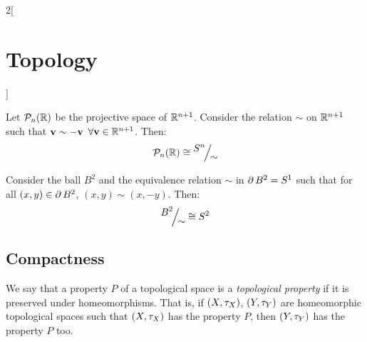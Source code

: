 \documentclass[../../../main.tex]{subfiles}
\begin{document}
\begin{multicols}{2}[\section{Topology}]
\begin{center}
\begin{minipage}{\linewidth}
            \centering
            
            \label{TOP_klein}
        \end{minipage}
    \end{center}
    \begin{prop}
        Let $\mathcal{P}_n(\mathbb{R})$ be the projective space of $\mathbb{R}^{n+1}$. Consider the relation $\sim$ on $\mathbb{R}^{n+1}$ such that $\boldsymbol{\mathrm{v}}\sim -\boldsymbol{\mathrm{v}}$ $\forall \boldsymbol{\mathrm{v}}\in\mathbb{R}^{n+1}$. Then: $$\mathcal{P}_n(\RR)\cong\quot{S^n}{\sim}$$
    \end{prop}
    \begin{prop}\label{TOP_circle-sim}
        Consider the ball $B^2$ and the equivalence relation $\sim$ in $\operatorname{\partial} B^2=S^1$ such that for all $(x,y)\in \operatorname{\partial} B^2$, $(x,y)\sim(x,-y)$. Then: $$\quot{B^2}{\sim}\cong S^2$$
        \begin{center}
            \begin{minipage}{\linewidth}
                \centering
                
            \end{minipage}
        \end{center}
    \end{prop}
    \subsection{Compactness}
    \begin{definition}
        We say that a property $P$ of a topological space is a \emph{topological property} if it is preserved under homeomorphisms. That is, if $(X,\tau_X)$, $(Y,\tau_Y)$ are homeomorphic topological spaces such that $(X,\tau_X)$ has the property $P$, then $(Y,\tau_Y)$ has the property $P$ too.
    \end{definition}

\end{multicols}
\end{document}
